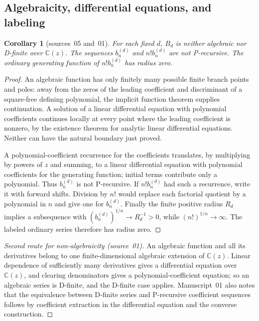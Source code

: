 \documentclass[11pt,a4paper]{article}
\newtheorem{corollary}[theorem]{Corollary}
\theoremstyle{definition}
\newcommand{\C}{\mathbb C}
\begin{document}
\subsection{Algebraicity, differential equations, and labeling}
\begin{corollary}[sources~05 and~01]\label{sbd:xtm:cor:nonholonomic}
For each fixed $d$, $B_d$ is neither algebraic nor D-finite over $\C(z)$.
The sequences $b_n^{(d)}$ and $n!b_n^{(d)}$ are not P-recursive. The
ordinary generating function of $n!b_n^{(d)}$ has radius zero.
\end{corollary}
\begin{proof}
An algebraic function has only finitely many possible finite branch points
and poles: away from the zeros of the leading coefficient and discriminant
of a square-free defining polynomial, the implicit function theorem
supplies continuation. A solution of a linear differential equation with
polynomial coefficients continues locally at every point where the leading
coefficient is nonzero, by the existence theorem for analytic linear
differential equations. Neither can have the natural boundary just proved.

A polynomial-coefficient recurrence for the coefficients translates, by
multiplying by powers of $z$ and summing, to a linear differential equation
with polynomial coefficients for the generating function; initial terms
contribute only a polynomial. Thus $b_n^{(d)}$ is not P-recursive. If
$n!b_n^{(d)}$ had such a recurrence, write it with forward shifts. Division
by $n!$ would replace each factorial quotient by a polynomial in $n$ and
give one for $b_n^{(d)}$. Finally the finite positive radius $R_d$ implies
a subsequence with $(b_n^{(d)})^{1/n}\to R_d^{-1}>0$, while
$(n!)^{1/n}\to\infty$. The labeled ordinary series therefore has radius
zero.
\end{proof}

\begin{proof}[Second route for non-algebraicity (source~01)]
An algebraic function and all its derivatives belong to one
finite-dimensional algebraic extension of $\C(z)$. Linear dependence of
sufficiently many derivatives gives a differential equation over $\C(z)$,
and clearing denominators gives a polynomial-coefficient equation; so an
algebraic series is D-finite, and the D-finite case applies. Manuscript~01
also notes that the equivalence between D-finite series and P-recursive
coefficient sequences follows by coefficient extraction in the
differential equation and the converse construction.
\end{proof}
\end{document}
